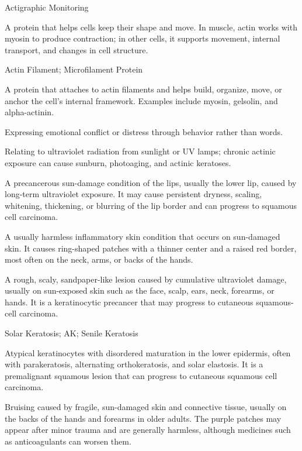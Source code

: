 \synonyms
Actigraphic Monitoring

 A protein that helps cells keep their shape and move. In muscle, actin works with myosin to produce contraction; in other cells, it supports movement, internal transport, and changes in cell structure.

\synonyms
Actin Filament; Microfilament Protein

 A protein that attaches to actin filaments and helps build, organize, move, or anchor the cell's internal framework. Examples include myosin, gelsolin, and alpha-actinin.

 Expressing emotional conflict or distress through behavior rather than words.

 Relating to ultraviolet radiation from sunlight or UV lamps; chronic actinic exposure can cause sunburn, photoaging, and actinic keratoses.

 A precancerous sun-damage condition of the lips, usually the lower lip, caused by long-term ultraviolet exposure. It may cause persistent dryness, scaling, whitening, thickening, or blurring of the lip border and can progress to squamous cell carcinoma.

 A usually harmless inflammatory skin condition that occurs on sun-damaged skin. It causes ring-shaped patches with a thinner center and a raised red border, most often on the neck, arms, or backs of the hands.

 A rough, scaly, sandpaper-like lesion caused by cumulative ultraviolet damage, usually on sun-exposed skin such as the face, scalp, ears, neck, forearms, or hands. It is a keratinocytic precancer that may progress to cutaneous squamous-cell carcinoma.

\synonyms
Solar Keratosis; AK; Senile Keratosis

 Atypical keratinocytes with disordered maturation in the lower epidermis, often with parakeratosis, alternating orthokeratosis, and solar elastosis. It is a premalignant squamous lesion that can progress to cutaneous squamous cell carcinoma.

 Bruising caused by fragile, sun-damaged skin and connective tissue, usually on the backs of the hands and
forearms in older adults. The purple patches may appear after minor trauma and are generally harmless, although
medicines such as anticoagulants can worsen them.

